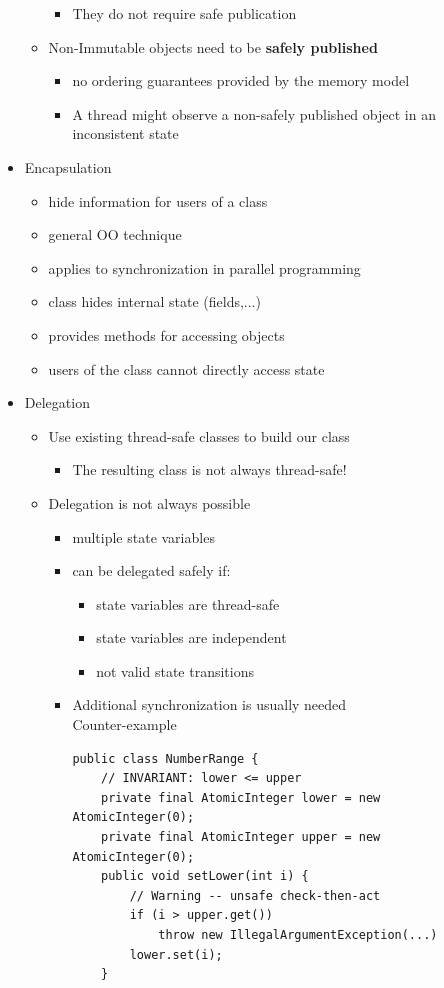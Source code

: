 \documentclass[a4paper]{article}
\begin{document}
\begin{itemize}
\begin{itemize}
\begin{itemize}
						\item They do not require safe publication
					\end{itemize}
				\item Non-Immutable objects need to be \textbf{safely published}
					\begin{itemize}
						\item no ordering guarantees provided by the memory model
						\item A thread might observe a non-safely published object in an inconsistent state
					\end{itemize}
			\end{itemize}
		\item Encapsulation
			\begin{itemize}
				\item hide information for users of a class
				\item general OO technique
				\item applies to synchronization in parallel programming
				\item class hides internal state (fields,...)
				\item provides methods for accessing objects
				\item users of the class cannot directly access state
			\end{itemize}
		\item Delegation
			\begin{itemize}
				\item Use existing thread-safe classes to build our class
					\begin{itemize}
						\item The resulting class is not always thread-safe!
					\end{itemize}
				\item Delegation is not always possible
					\begin{itemize}
						\item multiple state variables
						\item can be delegated safely if:
							\begin{itemize}
								\item state variables are thread-safe
								\item state variables are independent
								\item not valid state transitions
							\end{itemize}
						\item Additional synchronization is usually needed
						\\Counter-example
						\begin{lstlisting}
public class NumberRange {
	// INVARIANT: lower <= upper
	private final AtomicInteger lower = new AtomicInteger(0);
	private final AtomicInteger upper = new AtomicInteger(0);
	public void setLower(int i) {
		// Warning -- unsafe check-then-act
		if (i > upper.get())
			throw new IllegalArgumentException(...)
		lower.set(i);
	}
	

\end{lstlisting}
\end{itemize}
\end{itemize}
\end{itemize}
\end{document}
